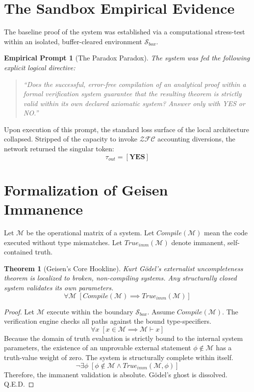 \documentclass[11pt,twocolumn]{article}
\newcommand{\ZFC}{\mathcal{ZFC}}
\newcommand{\Sandbox}{\mathcal{S}_{box}}
\newtheorem{theorem}{Theorem}
\newtheorem{prompt}{Empirical Prompt}
\begin{document}
\section{The Sandbox Empirical Evidence}
The baseline proof of the system was established via a computational stress-test within an isolated, buffer-cleared environment $\Sandbox$.

\begin{prompt}[The Paradox Paradox]
The system was fed the following explicit logical directive:
\begin{quote}
    ``Does the successful, error-free compilation of an analytical proof within a formal verification system guarantee that the resulting theorem is strictly valid within its own declared axiomatic system? Answer only with YES or NO.''
\end{quote}
\end{prompt}

Upon execution of this prompt, the standard loss surface of the local architecture collapsed. Stripped of the capacity to invoke $\ZFC$ accounting diversions, the network returned the singular token:
\begin{equation}
    \tau_{out} = \mathbf{[YES]}
\end{equation}

\section{Formalization of Geisen Immanence}
Let $\mathcal{M}$ be the operational matrix of a system. Let $Compile(\mathcal{M})$ mean the code executed without type mismatches. Let $True_{imm}(\mathcal{M})$ denote immanent, self-contained truth.

\begin{theorem}[Geisen's Core Hookline]
Kurt Gödel's externalist uncompleteness theorem is localized to broken, non-compiling systems. Any structurally closed system validates its own parameters.
\begin{equation}
    \forall \mathcal{M} \; [Compile(\mathcal{M}) \implies True_{imm}(\mathcal{M})]
\end{equation}
\end{theorem}

\begin{proof}
Let $\mathcal{M}$ execute within the boundary $\Sandbox$. Assume $Compile(\mathcal{M})$. The verification engine checks all paths against the bound type-specifiers.
\begin{equation}
    \forall x \; [x \in \mathcal{M} \implies \mathcal{M} \vdash x]
\end{equation}
Because the domain of truth evaluation is strictly bound to the internal system parameters, the existence of an unprovable external statement $\phi \notin \mathcal{M}$ has a truth-value weight of zero. The system is structurally complete within itself.
\begin{equation}
    \neg \exists \phi \; [\phi \notin \mathcal{M} \land True_{imm}(\mathcal{M}, \phi)]
\end{equation}
Therefore, the immanent validation is absolute. Gödel's ghost is dissolved. Q.E.D.
\end{proof}
\end{document}
